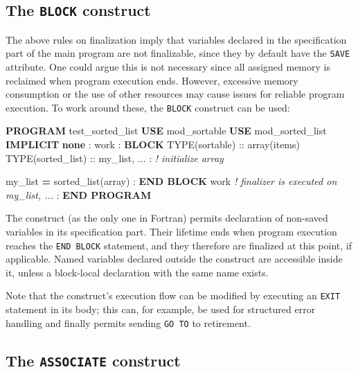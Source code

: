 \documentclass[
]{article}
\newenvironment{Shaded}{}{}
\newcommand{\CommentTok}[1]{\textcolor[rgb]{0.38,0.63,0.69}{\textit{#1}}}
\newcommand{\DataTypeTok}[1]{\textcolor[rgb]{0.56,0.13,0.00}{#1}}
\newcommand{\KeywordTok}[1]{\textcolor[rgb]{0.00,0.44,0.13}{\textbf{#1}}}
\newcommand{\NormalTok}[1]{#1}
\begin{document}
\subsection{\texorpdfstring{The \texttt{BLOCK}
construct}{The BLOCK construct}}\label{the-block-construct}

The above rules on finalization imply that variables declared in the
specification part of the main program are not finalizable, since they
by default have the \texttt{SAVE} attribute. One could argue this is not
necessary since all assigned memory is reclaimed when program execution
ends. However, excessive memory consumption or the use of other
resources may cause issues for reliable program execution. To work
around these, the \texttt{BLOCK} construct can be used:

\begin{Shaded}
\begin{Highlighting}[]
\KeywordTok{PROGRAM}\NormalTok{ test\_sorted\_list}
   \KeywordTok{USE}\NormalTok{ mod\_sortable}
   \KeywordTok{USE}\NormalTok{ mod\_sorted\_list}
   \KeywordTok{IMPLICIT} \KeywordTok{none}
\NormalTok{   :}
\NormalTok{   work : }\KeywordTok{BLOCK}
      \DataTypeTok{TYPE(sortable)} \DataTypeTok{::}\NormalTok{ array(items)}
      \DataTypeTok{TYPE(sorted\_list)} \DataTypeTok{::}\NormalTok{ my\_list, ...}
\NormalTok{      : }\CommentTok{! initialize array}

\NormalTok{      my\_list }\KeywordTok{=}\NormalTok{ sorted\_list(array)}
\NormalTok{      :}
   \KeywordTok{END BLOCK}\NormalTok{ work  }\CommentTok{! finalizer is executed on my\_list, ...}
\NormalTok{   :}
\KeywordTok{END PROGRAM}
\end{Highlighting}
\end{Shaded}

The construct (as the only one in Fortran) permits declaration of
non-saved variables in its specification part. Their lifetime ends when
program execution reaches the \texttt{END\ BLOCK} statement, and they
therefore are finalized at this point, if applicable. Named variables
declared outside the construct are accessible inside it, unless a
block-local declaration with the same name exists.

Note that the construct's execution flow can be modified by executing an
\texttt{EXIT} statement in its body; this can, for example, be used for
structured error handling and finally permits sending \texttt{GO\ TO} to
retirement.

\subsection{\texorpdfstring{The \texttt{ASSOCIATE}
construct}{The ASSOCIATE construct}}\label{the-associate-construct}
\end{document}
